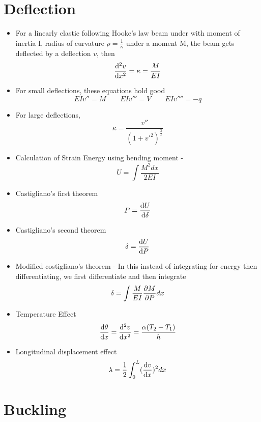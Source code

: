 \documentclass{article}
\begin{document}
\section{Deflection}

	\begin{itemize}
		\item For a linearly elastic following Hooke's law beam under with moment of inertia I, radius of curvature $\rho = \frac{1}{\kappa}$ under a moment M, the beam gets deflected by a deflection $v$, then
			\[\dv[2]{v}{x} = \kappa = \frac{M}{EI}\]
		\item For small deflections, these equations hold good
			\[EI v'' = M \qquad EI v''' = V \qquad EI v'''' = -q\]

		\item For large deflections, 
			\[\kappa = \frac{v''}{(1+v'^2)^{\frac{3}{2}}}\]

		\item Calculation of Strain Energy using bending moment - 
			\[ U = \int \frac{M^2 dx}{2EI}\]

		\item Castigliano's first theorem
			\[ P = \dv{U}{\delta} \]
		\item Castigliano's second theorem
			\[\delta = \dv{U}{P} \]

		\item Modified costigliano's theorem - In this instead of integrating for energy then differentiating, we first differentiate and then integrate
			\[ \delta = \int \frac{M}{EI}\pdv{M}{P} dx\]

		\item Temperature Effect
			\[\dv{\theta}{x} = \dv[2]{v}{x} = \frac{\alpha (T_2 - T_1)}{h}\]

		\item Longitudinal displacement effect
			\[ \lambda = \frac{1}{2} \int_0^L (\dv{v}{x})^2 dx\]

	\end{itemize}




\section{Buckling}
\end{document}
